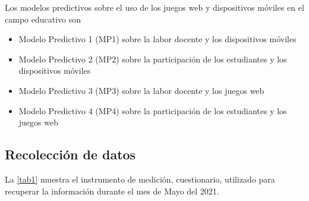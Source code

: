 \documentclass[spanish]{textolivre}
\begin{document}
Los modelos predictivos sobre el uso de los juegos web y dispositivos móviles en el campo educativo son

\begin{itemize}
    \item Modelo Predictivo 1 (MP1) sobre la labor docente y los dispositivos móviles 
    \item Modelo Predictivo 2 (MP2) sobre la participación de los estudiantes y los dispositivos móviles
    \item Modelo Predictivo 3 (MP3) sobre la labor docente y los juegos web
    \item Modelo Predictivo 4 (MP4) sobre la participación de los estudiantes y los juegos web
\end{itemize}

\subsection{Recolección de datos}
La \cref{tab1} muestra el instrumento de medición, cuestionario, utilizado para recuperar la información durante el mes de Mayo del 2021.
\end{document}
